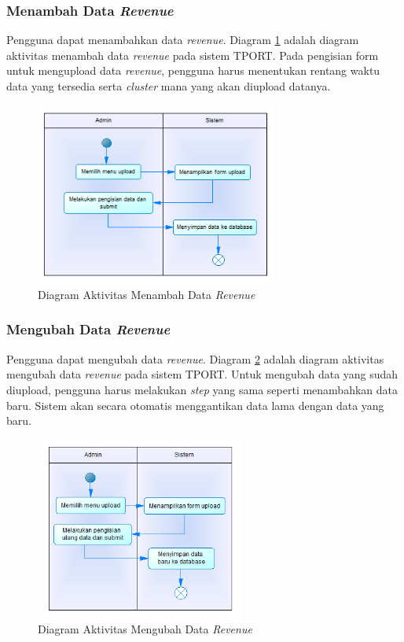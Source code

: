 \subsubsection{Menambah Data \textit{Revenue}}
Pengguna dapat menambahkan data \textit{revenue}. Diagram \ref{figure:activity_menambah_data_revenue} adalah diagram aktivitas menambah data \textit{revenue} pada sistem TPORT. Pada pengisian form untuk mengupload data \textit{revenue}, pengguna harus menentukan rentang waktu data yang tersedia serta \textit{cluster} mana yang akan diupload datanya.
	
	\begin{figure}[h]
	\centerline {\includegraphics[width=8cm,height=6cm]{bab4/activity_menambah_data_revenue.png}}
	\caption{Diagram Aktivitas Menambah Data \textit{Revenue}}
	\label{figure:activity_menambah_data_revenue}
	\end{figure}
		
\subsubsection{Mengubah Data \textit{Revenue}}
Pengguna dapat mengubah data \textit{revenue}. Diagram \ref{figure:activity_mengubah_data_revenue} adalah diagram aktivitas mengubah data \textit{revenue} pada sistem TPORT. Untuk mengubah data yang sudah diupload, pengguna harus melakukan \textit{step} yang sama seperti menambahkan data baru. Sistem akan secara otomatis menggantikan data lama dengan data yang baru.
	
	\begin{figure}[h]
	\centerline {\includegraphics[width=7cm,height=6cm]{bab4/activity_mengubah_data_revenue.png}}
	\caption{Diagram Aktivitas Mengubah Data \textit{Revenue}}
	\label{figure:activity_mengubah_data_revenue}
	\end{figure}

